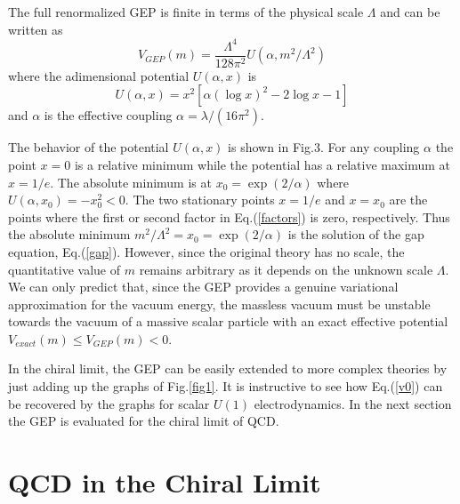 \documentclass[aps,preprint]{revtex4}
\newcommand{\BE}{\begin{equation}}
\newcommand{\EE}{\end{equation}}
\begin{document}
The full renormalized GEP is finite in terms of the physical scale $\Lambda$ and can be written as
\BE
V_{GEP}(m)=\frac{\Lambda^4}{128\pi^2} U(\alpha, m^2/\Lambda^2)
\EE
where the adimensional potential $U(\alpha,x)$ is 
\BE
U(\alpha,x)=x^2\left[\alpha (\log x)^2-2\log x-1\right]
\label{U}
\EE
and $\alpha$ is the effective coupling $\alpha=\lambda/(16\pi^2)$.

The behavior of the potential $U(\alpha,x)$ is shown in Fig.3. For any coupling $\alpha$ the point
$x=0$ is a relative minimum while the potential has a relative maximum at $x=1/e$.
The absolute  minimum is at $x_0=\exp(2/\alpha)$ where $U(\alpha,x_0)=-x_0^2<0$. The two stationary points
$x=1/e$ and $x=x_0$ are the points where the first or second factor in Eq.(\ref{factors}) is zero, respectively.
Thus the absolute minimum $m^2/\Lambda^2=x_0=\exp(2/\alpha)$ is the solution of the gap equation, Eq.(\ref{gap}).
However, since the original theory has no scale, the quantitative value of $m$ remains arbitrary as it
depends on the unknown scale $\Lambda$. We can only predict that, since the GEP provides a genuine variational
approximation for the vacuum energy, the massless vacuum must be unstable towards the vacuum of a massive scalar 
particle with an exact effective potential $V_{exact} (m)\le V_{GEP}(m) <0$.

In the chiral limit, the GEP can be easily extended to more complex theories by just adding up the
graphs of Fig.\ref{fig1}. It is instructive to see how Eq.(\ref{v0}) can be recovered by the graphs for
scalar $U(1)$ electrodynamics. In the next section the GEP is evaluated for the chiral limit of QCD.


\section{QCD in the Chiral Limit}\label{sec4}
\end{document}
